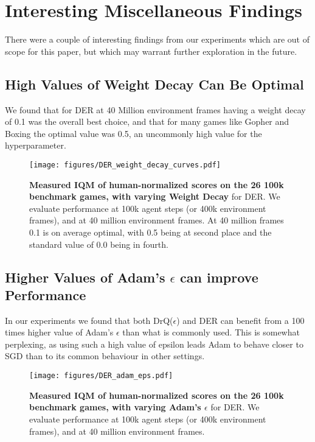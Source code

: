 \clearpage

\section{Interesting Miscellaneous Findings}
\label{sec:imf}
There were a couple of interesting findings from our experiments which are out of scope for this paper, but which may warrant further exploration in the future.

\subsection{High Values of Weight Decay Can Be Optimal}
We found that for DER at 40 Million environment frames having a weight decay of 0.1 was the overall best choice, and that for many games like Gopher and Boxing the optimal value was 0.5, an uncommonly high value for the hyperparameter. 
\begin{figure}[!ht]
    \centering
  \texttt{[image: figures/DER\_weight\_decay\_curves.pdf]}%
    \caption{
     \textbf{Measured IQM of human-normalized scores on the 26 100k benchmark games, with varying Weight Decay} for DER. We evaluate performance at 100k agent steps (or 400k environment frames), and at 40 million environment frames. At 40 million frames 0.1 is on average optimal, with 0.5 being at second place and the standard value of 0.0 being in fourth.
    }
    \label{fig:imf_wd}
\end{figure}

\subsection{Higher Values of Adam's $\epsilon$ can improve Performance}
In our experiments we found that both DrQ($\epsilon$) and DER can benefit from a 100 times higher value of Adam's $\epsilon$ than what is commonly used. This is somewhat perplexing, as using such a high value of epsilon leads Adam to behave closer to SGD than to its common behaviour in other settings.
\begin{figure}[!ht]
    \centering
  \texttt{[image: figures/DER\_adam\_eps.pdf]}%
    \caption{
     \textbf{Measured IQM of human-normalized scores on the 26 100k benchmark games, with varying Adam's $\epsilon$} for DER. We evaluate performance at 100k agent steps (or 400k environment frames), and at 40 million environment frames.
    }
    \label{fig:imf_adam_eps}
\end{figure}

